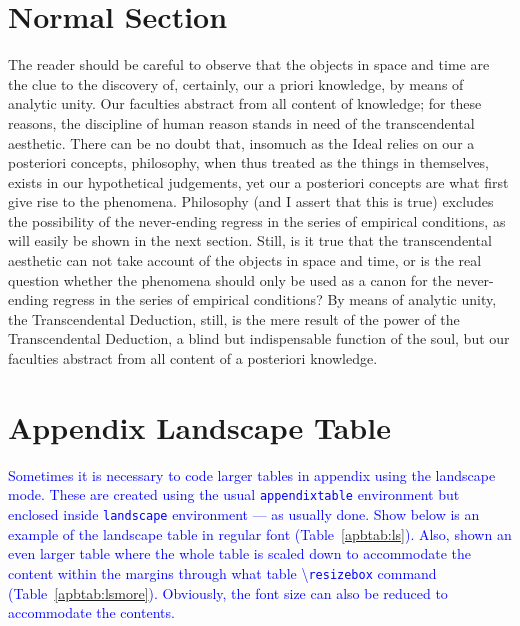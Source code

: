 \documentclass[phd,showgrids]{ndsu-thesis-2022}
\newcommand\italk[1]{\textcolor{blue}{#1}}  %
\newcommand\cmd[1]{\textbackslash\texttt{#1}}  %
\begin{document}
\section{Normal Section}
The reader should be careful to observe that the objects in space and time are the clue to the discovery of, certainly, our a priori knowledge, by means of analytic unity. Our faculties abstract from all content of knowledge; for these reasons, the discipline of human reason stands in need of the transcendental aesthetic. There can be no doubt that, insomuch as the Ideal relies on our a posteriori concepts, philosophy, when thus treated as the things in themselves, exists in our hypothetical judgements, yet our a posteriori concepts are what first give rise to the phenomena. Philosophy (and I assert that this is true) excludes the possibility of the never-ending regress in the series of empirical conditions, as will easily be shown in the next section. Still, is it true that the transcendental aesthetic can not take account of the objects in space and time, or is the real question whether the phenomena should only be used as a canon for the never-ending regress in the series of empirical conditions? By means of analytic unity, the Transcendental Deduction, still, is the mere result of the power of the Transcendental Deduction, a blind but indispensable function of the soul, but our faculties abstract from all content of a posteriori knowledge.

\section{Appendix Landscape Table}
\italk{Sometimes it is necessary to code larger tables in appendix using the landscape mode. These are created using the usual \texttt{appendixtable} environment but enclosed inside \texttt{landscape} environment --- as usually done. Show below is an example of the landscape table in regular font (Table~\ref{apbtab:ls}). Also, shown an even larger table where the whole table is scaled down to accommodate the content within the margins through what table \cmd{resizebox} command (Table~\ref{apbtab:lsmore}). Obviously, the font size can also be reduced to accommodate the contents. }
\end{document}
